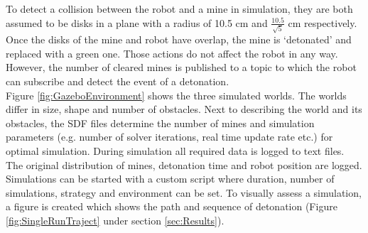 \documentclass[conference]{IEEEtran}
\begin{document}
To detect a collision between the robot and a mine in simulation, they are both assumed to be disks in a plane with a radius of 10.5 cm and $\frac{10.5}{\sqrt{5}}$ cm respectively. Once the disks of the mine and robot have overlap, the mine is ‘detonated’ and replaced with a green one. Those actions do not affect the robot in any way. However, the number of cleared mines is published to a topic to which the robot can subscribe and detect the event of a detonation. \\


Figure \ref{fig:GazeboEnvironment} shows the three simulated worlds. The worlds differ in size, shape and number of obstacles. Next to describing the world and its obstacles, the SDF files determine the number of mines and simulation parameters (e.g. number of solver iterations, real time update rate etc.) for optimal simulation. During simulation all required data is logged to text files. The original distribution of mines, detonation time and robot position are logged. Simulations can be started with a custom script where duration, number of simulations, strategy and environment can be set. To visually assess a simulation, a figure is created which shows the path and sequence of detonation (Figure \ref{fig:SingleRunTraject} under section \ref{sec:Results}).
\end{document}
